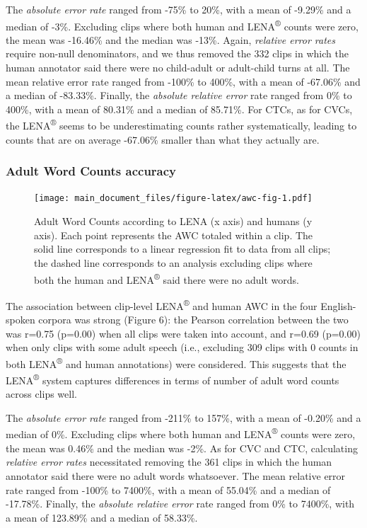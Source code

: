 \documentclass[english,floatsintext,man]{apa6}
\begin{document}
The \emph{absolute error rate} ranged from -75\% to 20\%, with a mean of
-9.29\% and a median of -3\%. Excluding clips where both human and
LENA\textsuperscript{®} counts were zero, the mean was -16.46\% and the
median was -13\%. Again, \emph{relative error rates} require non-null
denominators, and we thus removed the 332 clips in which the human
annotator said there were no child-adult or adult-child turns at all.
The mean relative error rate ranged from -100\% to 400\%, with a mean of
-67.06\% and a median of -83.33\%. Finally, the \emph{absolute relative
error} rate ranged from 0\% to 400\%, with a mean of 80.31\% and a
median of 85.71\%. For CTCs, as for CVCs, the LENA\textsuperscript{®}
seems to be underestimating counts rather systematically, leading to
counts that are on average -67.06\% smaller than what they actually are.

\subsubsection{Adult Word Counts
accuracy}\label{adult-word-counts-accuracy}

\begin{figure}
\centering
\texttt{[image: main\_document\_files/figure-latex/awc-fig-1.pdf]}
\caption{\label{fig:awc-fig}Adult Word Counts according to LENA (x axis) and
humans (y axis). Each point represents the AWC totaled within a clip.
The solid line corresponds to a linear regression fit to data from all
clips; the dashed line corresponds to an analysis excluding clips where
both the human and LENA\textsuperscript{®} said there were no adult
words.}
\end{figure}

The association between clip-level LENA\textsuperscript{®} and human AWC
in the four English-spoken corpora was strong (Figure 6): the Pearson
correlation between the two was r=0.75 (p=0.00) when all clips were
taken into account, and r=0.69 (p=0.00) when only clips with some adult
speech (i.e., excluding 309 clips with 0 counts in both
LENA\textsuperscript{®} and human annotations) were considered. This
suggests that the LENA\textsuperscript{®} system captures differences in
terms of number of adult word counts across clips well.

The \emph{absolute error rate} ranged from -211\% to 157\%, with a mean
of -0.20\% and a median of 0\%. Excluding clips where both human and
LENA\textsuperscript{®} counts were zero, the mean was 0.46\% and the
median was -2\%. As for CVC and CTC, calculating \emph{relative error
rates} necessitated removing the 361 clips in which the human annotator
said there were no adult words whatsoever. The mean relative error rate
ranged from -100\% to 7400\%, with a mean of 55.04\% and a median of
-17.78\%. Finally, the \emph{absolute relative error} rate ranged from
0\% to 7400\%, with a mean of 123.89\% and a median of 58.33\%.
\end{document}
